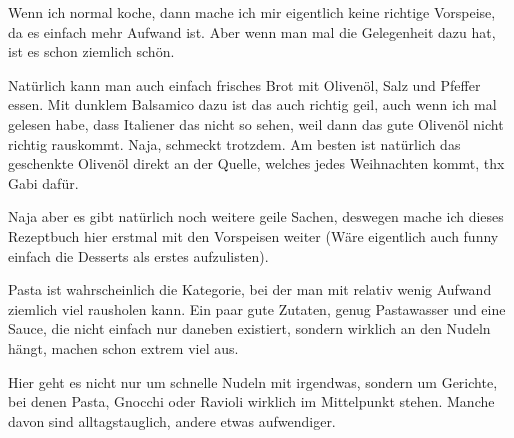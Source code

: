 \documentclass[
  a4paper,
  twoside,
  11pt
]{article}
\begin{document}

Wenn ich normal koche, dann mache ich mir eigentlich keine richtige Vorspeise, da es einfach mehr Aufwand ist. Aber wenn man mal die Gelegenheit dazu hat, ist es schon ziemlich schön.

Natürlich kann man auch einfach frisches Brot mit Olivenöl, Salz und Pfeffer essen. Mit dunklem Balsamico dazu ist das auch richtig geil, auch wenn ich mal gelesen habe, dass Italiener das nicht so sehen, weil dann das gute Olivenöl nicht richtig rauskommt. Naja, schmeckt trotzdem. Am besten ist natürlich das geschenkte Olivenöl direkt an der Quelle, welches jedes Weihnachten kommt, thx Gabi dafür.

Naja aber es gibt natürlich noch weitere geile Sachen, deswegen mache ich dieses Rezeptbuch hier erstmal mit den Vorspeisen weiter (Wäre eigentlich auch funny einfach die Desserts als erstes aufzulisten).


\mylocaltableofcontents%
\newpage











Pasta ist wahrscheinlich die Kategorie, bei der man mit relativ wenig Aufwand ziemlich viel rausholen kann. Ein paar gute Zutaten, genug Pastawasser und eine Sauce, die nicht einfach nur daneben existiert, sondern wirklich an den Nudeln hängt, machen schon extrem viel aus.

Hier geht es nicht nur um schnelle Nudeln mit irgendwas, sondern um Gerichte, bei denen Pasta, Gnocchi oder Ravioli wirklich im Mittelpunkt stehen. Manche davon sind alltagstauglich, andere etwas aufwendiger.

\mylocaltableofcontents%
\newpage










\end{document}
